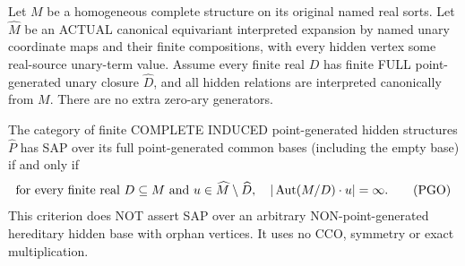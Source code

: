 \begin{lemma}
\label{lem:typed-point-generated-sap-criterion}
Let $M$ be a homogeneous complete structure on its original
named real sorts.  Let $\widehat M$ be an ACTUAL canonical
equivariant interpreted expansion by named unary coordinate
maps and their finite compositions, with every hidden vertex
some real-source unary-term value.  Assume every finite real
$D$ has finite FULL point-generated unary closure
$\widehat D$, and all hidden relations are interpreted
canonically from $M$.  There are no extra zero-ary generators.

The category of finite COMPLETE INDUCED point-generated hidden
structures $\widehat P$ has SAP over its full point-generated
common bases (including the empty base) if and only if
\[
 \text{for every finite real }D\subseteq M
 \text{ and }u\in\widehat M\setminus\widehat D,\quad
             |\operatorname{Aut}(M/D)\cdot u|=\infty.
 \tag{PGO}\label{eq:typed-point-generated-sap-criterion}
\]
This criterion does NOT assert SAP over an arbitrary
NON-point-generated hereditary hidden base with orphan vertices.
It uses no CCO, symmetry or exact multiplication.
\end{lemma}
